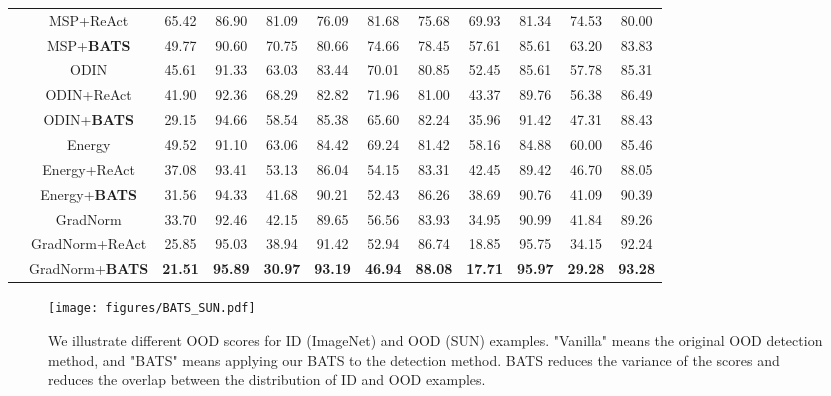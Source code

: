 \documentclass{article}
\begin{document}
\begin{table}[htbp]
{\begin{tabular}{cccccccccccc}
 & MSP+ReAct & 65.42 & 86.90 & 81.09 & 76.09 & 81.68 & 75.68 & 69.93 & 81.34 & 74.53 & 80.00 \\
 & MSP+\textbf{BATS} & 49.77 & 90.60 & 70.75 & 80.66 & 74.66 & 78.45 & 57.61 & 85.61 & 63.20 & 83.83 \\ \cline{2-12} 
 & ODIN & 45.61 & 91.33 & 63.03 & 83.44 & 70.01 & 80.85 & 52.45 & 85.61 & 57.78 & 85.31 \\
 & ODIN+ReAct & 41.90 & 92.36 & 68.29 & 82.82 & 71.96 & 81.00 & 43.37 & 89.76 & 56.38 & 86.49 \\
 & ODIN+\textbf{BATS} & 29.15 & 94.66 & 58.54 & 85.38 & 65.60 & 82.24 & 35.96 & 91.42 & 47.31 & 88.43 \\ \cline{2-12} 
 & Energy & 49.52 & 91.10 & 63.06 & 84.42 & 69.24 & 81.42 & 58.16 & 84.88 & 60.00 & 85.46 \\
 & Energy+ReAct & 37.08 & 93.41 & 53.13 & 86.04 & 54.15 & 83.31 & 42.45 & 89.42 & 46.70 & 88.05 \\
 & Energy+\textbf{BATS} & 31.56 & 94.33 & 41.68 & 90.21 & 52.43 & 86.26 & 38.69 & 90.76 & 41.09 & 90.39 \\ \cline{2-12} 
 & GradNorm & 33.70 & 92.46 & 42.15 & 89.65 & 56.56 & 83.93 & 34.95 & 90.99 & 41.84 & 89.26 \\
 & GradNorm+ReAct & 25.85 & 95.03 & 38.94 & 91.42 & 52.94 & 86.74 & 18.85 & 95.75 & 34.15 & 92.24 \\
 & GradNorm+\textbf{BATS} & \textbf{21.51} & \textbf{95.89} & \textbf{30.97} & \textbf{93.19} & \textbf{46.94} & \textbf{88.08} & \textbf{17.71} & \textbf{95.97} & \textbf{29.28} & \textbf{93.28} \\ \hline \hline
\end{tabular}\label{tab:combine}}
\end{table}


\begin{figure}[htbp]  
\centering
\texttt{[image: figures/BATS\_SUN.pdf]}
\caption{We illustrate different OOD scores for ID (ImageNet) and OOD (SUN) examples. "Vanilla" means the original OOD detection method, and "BATS" means applying our BATS to the detection method. BATS reduces the variance of the scores and reduces the overlap between the distribution of ID and OOD examples.}
\label{img:BATS_SUN}
\end{figure}
\end{document}

